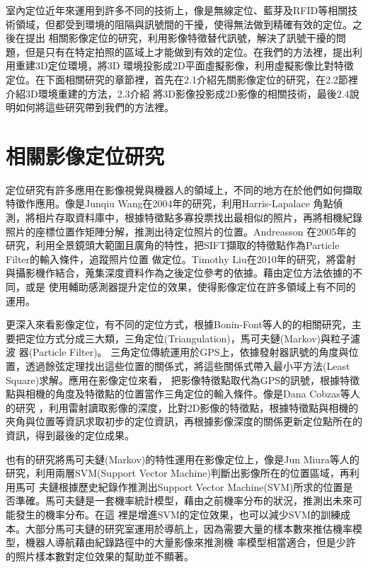 
	室內定位近年來運用到許多不同的技術上，像是無線定位、藍芽及RFID等相關技術領域，但都受到環境的阻隔與訊號間的干擾，使得無法做到精確有效的定位。之後在提出
相關影像定位的研究，利用影像特徵替代訊號，解決了訊號干擾的問題，但是只有在特定拍照的區域上才能做到有效的定位。在我們的方法裡，提出利用重建3D定位環境，將3D
環境投影成2D平面虛擬影像，利用虛擬影像比對特徵定位。在下面相關研究的章節裡，首先在2.1介紹先關影像定位的研究，在2.2節裡介紹3D環境重建的方法，2.3介紹
將3D影像投影成2D影像的相關技術，最後2.4說明如何將這些研究帶到我們的方法裡。

\section{相關影像定位研究}
	定位研究有許多應用在影像視覺與機器人的領域上，不同的地方在於他們如何擷取特徵作應用。像是Junqiu Wang在2004年的研究，利用Harris-Lapalace	
角點偵測，將相片存取資料庫中，根據特徵點多寡投票找出最相似的照片，再將相機紀錄照片的座標位置作矩陣分解，推測出待定位照片的位置。Andreasson
在2005年的研究\cite{Andreasson2005}，利用全景鏡頭大範圍且廣角的特性，把SIFT擷取的特徵點作為Particle Filter的輸入條件，追蹤照片位置
做定位。Timothy Liu在2010年的研究\cite{LiuT2010}，將雷射與攝影機作結合，蒐集深度資料作為之後定位參考的依據。藉由定位方法依據的不同，或是
使用輔助感測器提升定位的效果，使得影像定位在許多領域上有不同的運用。

	更深入來看影像定位，有不同的定位方式，根據Bonin-Font等人的\cite{Bonin-Font2008}的相關研究，主要把定位方式分成三大類，三角定位(Triangulation)，馬可夫鏈(Markov)與粒子濾波
器(Particle Filter)。
三角定位傳統運用於GPS上，依據發射器訊號的角度與位置，透過餘弦定理找出這些位置的關係式，將這些關係式帶入最小平方法(Least Square)求解。應用在影像定位來看，
把影像特徵點取代為GPS的訊號，根據特徵點與相機的角度及特徵點的位置當作三角定位的輸入條件。像是Dana Cobzas\cite{Cobzas2003}等人的研究
，利用雷射讀取影像的深度，比對2D影像的特徵點，根據特徵點與相機的夾角與位置等資訊求取初步的定位資訊，再根據影像深度的關係更新定位點所在的資訊，得到最後的定位成果。

	也有的研究將馬可夫鏈(Markov)的特性運用在影像定位上，像是Jun Miura等人的研究，利用兩層SVM(Support Vector Machine)判斷出影像所在的位置區域，再利用馬可
夫鏈根據歷史紀錄作推測出Support Vector Machine(SVM)所求的位置是否準確。馬可夫鏈是一套機率統計模型，藉由之前機率分布的狀況，推測出未來可能發生的機率分布。在這
裡是增進SVM的定位效果，也可以減少SVM的訓練成本。大部分馬可夫鏈的研究室運用於導航上，因為需要大量的樣本數來推估機率模型，機器人導航藉由紀錄路徑中的大量影像來推測機
率模型相當適合，但是少許的照片樣本數對定位效果的幫助並不顯著。

